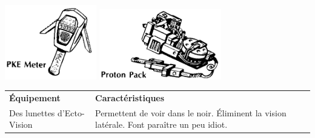 \begin{frame}[b]
{}{%
\begin{center}
\includegraphics[width=0.3\textwidth]{./images/pke.png} \hspace{0.5cm}  \includegraphics[width=0.4\textwidth]{./images/proton.png}\textsl{}
\end{center}

\begin{center}
\begin{tabular}{>{\raggedright\arraybackslash}p{1.8cm} p{6cm}}
\textbf{Équipement} & \textbf{Caractéristiques}\\
Des lunettes d'Ecto-Vision & Permettent de voir dans le noir. Éliminent la vision latérale. Font paraître un peu idiot.\\
\end{tabular}
\end{center}
}
\end{frame}
